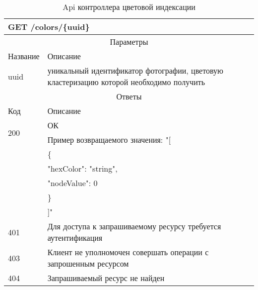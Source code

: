 \begin{table}[H]
  \caption{Api контроллера цветовой индексации}\label{api-colors-table}
  \begin{tabular}{|p{6cm}|p{10cm}|}
  \hline \multicolumn{2}{|l|}{GET /colors/\{uuid\}} \\
  \hline \multicolumn{2}{|c|}{Параметры} \\
  \hline Название & Описание \\
  \hline uuid & уникальный идентификатор фотографии, цветовую кластеризацию которой необходимо получить \\
  \hline \multicolumn{2}{|c|}{Ответы} \\
  \hline Код & Описание \\
  \hline \multirow{2}{=}{200} & ОК \\
   & Пример возвращаемого значения: "[ \\
   & \{ \\
   &   "hexColor": "string", \\
   &   "nodeValue": 0 \\
   & \} \\
   & ]"\\
  \hline 401 & Для доступа к запрашиваемому ресурсу требуется аутентификация \\
  \hline 403 & Клиент не уполномочен совершать операции с запрошенным ресурсом \\
  \hline 404 & Запрашиваемый ресурс не найден \\
  \hline
  \end{tabular}
\end{table}

